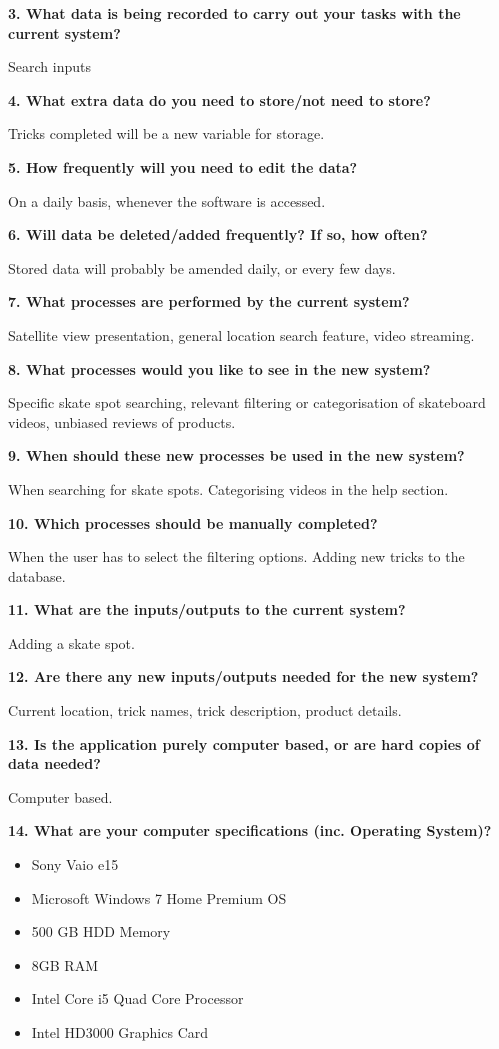 \textbf{3. What data is being recorded to carry out your tasks with the current system?} 

Search inputs

\textbf{4. What extra data do you need to store/not need to store?} 

Tricks completed will be a new variable for storage.

\textbf{5. How frequently will you need to edit the data?}

On a daily basis, whenever the software is accessed.

\textbf{6. Will data be deleted/added frequently? If so, how often?} 

Stored data will probably be amended daily, or every few days.

\textbf{7. What processes are performed by the current system?}

Satellite view presentation, general location search feature, video streaming.

\textbf{8. What processes would you like to see in the new system?}

Specific skate spot searching, relevant filtering or categorisation of skateboard videos, unbiased reviews of products.

\textbf{9. When should these new processes be used in the new system?}

When searching for skate spots. Categorising videos in the help section.

\textbf{10. Which processes should be manually completed?} 

When the user has to select the filtering options. Adding new tricks to the database.

\textbf{11. What are the inputs/outputs to the current system?}

Adding a skate spot.

\textbf{12. Are there any new inputs/outputs needed for the new system?} 

Current location, trick names, trick description, product details.

\textbf{13. Is the application purely computer based, or are hard copies of data needed? }

Computer based.

\textbf{14. What are your computer specifications (inc. Operating System)?} 
\begin{itemize}
\item Sony Vaio e15
\item Microsoft Windows 7 Home Premium OS
\item 500 GB HDD Memory
\item 8GB RAM
\item Intel Core i5 Quad Core Processor
\item Intel HD3000 Graphics Card
\end{itemize}

